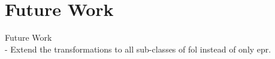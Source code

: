 \chapter{Future Work}\label{chap:todo}
Future Work
\\
- Extend the transformations to all sub-classes of \ac{fol} instead of only \ac{epr}.

\cite{sep-reasoning-automated}
\cite{sep-logic-classical}
